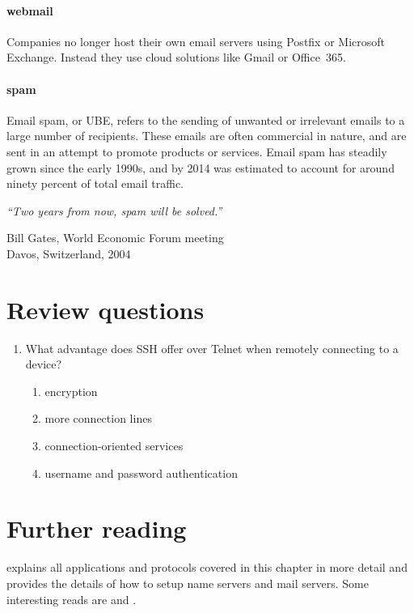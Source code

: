 \paragraph{webmail}
Companies no longer host their own email servers using Postfix or Microsoft Exchange.
Instead they use cloud solutions like Gmail or Office~365.

\paragraph{spam}
Email spam, or \acf{UBE}, refers to the sending of unwanted or irrelevant emails to a large number of recipients.
These emails are often commercial in nature, and are sent in an attempt to promote products or services.
Email spam has steadily grown since the early 1990s, and by 2014 was estimated to account for around ninety percent of total email traffic.

\epigraph{\emph{``Two years from now, spam will be solved.''}}{Bill Gates, World Economic Forum meeting\\ Davos, Switzerland, 2004}



\section{Review questions}
\begin{enumerate}
\item
   What advantage does \acs{SSH} offer over Telnet when remotely connecting to a device?
   \begin{enumerate}
   \item encryption
   \item more connection lines
   \item connection-oriented services
   \item username and password authentication
   \end{enumerate}
\end{enumerate}


\section{Further reading}
\textcite{nemeth} explains all applications and protocols covered in this chapter in more detail and provides the details of how to setup name servers and mail servers.
Some interesting reads are  and .
